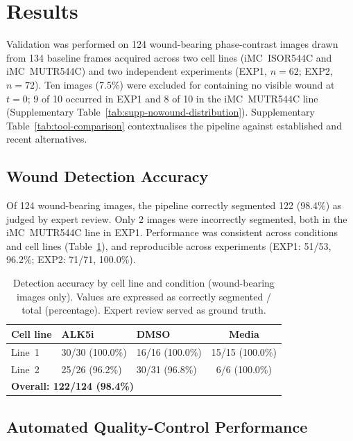\section{Results}

Validation was performed on 124 wound-bearing phase-contrast images drawn from 134
baseline frames acquired across two cell lines (iMC~ISOR544C and iMC~MUTR544C) and
two independent experiments (EXP1, $n = 62$; EXP2, $n = 72$).
Ten images (7.5\%) were excluded for containing no visible wound at $t = 0$;
9 of 10 occurred in EXP1 and 8 of 10 in the iMC~MUTR544C line
(Supplementary Table~\ref{tab:supp-nowound-distribution}). Supplementary Table~\ref{tab:tool-comparison} contextualises the pipeline against established and recent
alternatives. 

\subsection{Wound Detection Accuracy}

Of 124 wound-bearing images, the pipeline correctly segmented 122 (98.4\%) as judged
by expert review.
Only 2 images were incorrectly segmented, both in the iMC~MUTR544C line in EXP1.
Performance was consistent across conditions and cell lines (Table~\ref{tab:accuracy}), and
reproducible across experiments (EXP1: 51/53, 96.2\%; EXP2: 71/71, 100.0\%).

\begin{table}[H]
\centering
\caption{Detection accuracy by cell line and condition (wound-bearing images only).
  Values are expressed as correctly segmented / total (percentage).
  Expert review served as ground truth.}
\label{tab:accuracy}
\begin{tabular}{lllc}
\toprule
Cell line & ALK5i & DMSO & Media \\
\midrule
Line~1 & 30/30 (100.0\%) & 16/16 (100.0\%) & 15/15 (100.0\%) \\
Line~2 & 25/26 (96.2\%)  & 30/31 (96.8\%)  & 6/6 (100.0\%)   \\
\midrule
\multicolumn{4}{l}{\textbf{Overall: 122/124 (98.4\%)}} \\
\bottomrule
\end{tabular}
\end{table}

\subsection{Automated Quality-Control Performance}

